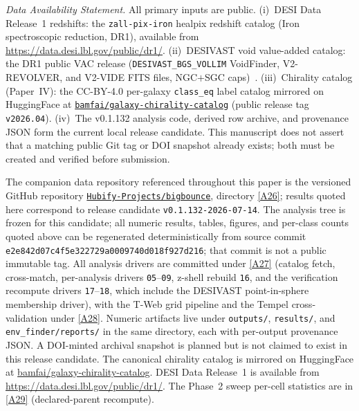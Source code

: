 \documentclass[aps,prd,twocolumn,superscriptaddress,showpacs,preprintnumbers,nofootinbib,longbibliography,floatfix]{revtex4-2}
\newcommand{\repoBase}{https://github.com/Hubify-Projects/bigbounce/blob/main}
\newcommand{\paperVersion}{v0.1.132-2026-07-14}
\begin{document}
\emph{Data Availability Statement.} All primary inputs are public.
(i)~DESI Data Release~1 redshifts: the \texttt{zall-pix-iron} healpix
redshift catalog (Iron spectroscopic reduction, DR1), available from
\url{https://data.desi.lbl.gov/public/dr1/}.
(ii)~DESIVAST void value-added catalog: the DR1 public VAC release
(\texttt{DESIVAST\_BGS\_VOLLIM} VoidFinder, V2-REVOLVER, and V2-VIDE
FITS files, NGC$+$SGC caps)~\cite{DESIVAST2025}.
(iii)~Chirality catalog (Paper~IV): the CC-BY-4.0 per-galaxy
\texttt{class\_eq} label catalog mirrored on HuggingFace at
\href{https://huggingface.co/datasets/bamfai/galaxy-chirality-catalog}%
{\texttt{bamfai/galaxy-chirality-catalog}} (public release tag
\texttt{v2026.04}).
(iv)~The v0.1.132 analysis code, derived row archive, and provenance JSON
form the current local release candidate. This manuscript does not assert that a
matching public Git tag or DOI snapshot already exists; both must be
created and verified before submission.

The companion data repository referenced throughout this paper is the
versioned GitHub repository
\href{https://github.com/Hubify-Projects/bigbounce}%
{\texttt{Hubify-Projects/bigbounce}}, directory
\href{\repoBase/pipelines/p5\_desi\_chirality/}{[A26]}; results quoted here
correspond to release candidate \texttt{\paperVersion}. The analysis
tree is frozen for this candidate; all numeric results, tables,
figures, and per-class counts quoted above can be regenerated
deterministically from source commit
\texttt{e2e842d07c4f5e322729a0009740d018f927d216}; that commit is not a
public immutable tag. All analysis
drivers are committed under
\href{\repoBase/pipelines/p5\_desi\_chirality/scripts/}{[A27]} (catalog fetch,
cross-match, per-analysis drivers \texttt{05}--\texttt{09}, z-shell
rebuild \texttt{16}, and the verification recompute drivers
\texttt{17}--\texttt{18}, which include the DESIVAST point-in-sphere
membership driver), with the T-Web grid pipeline and the Tempel
cross-validation under
\href{\repoBase/pipelines/p5\_desi\_chirality/env\_finder/}{[A28]}. Numeric
artifacts live under \texttt{outputs/}, \texttt{results/}, and
\texttt{env\_finder/reports/} in the same directory, each with
per-output provenance JSON. A DOI-minted archival snapshot is planned
but is not claimed to exist in this release candidate. The canonical chirality
catalog is mirrored on HuggingFace at
\href{https://huggingface.co/datasets/bamfai/galaxy-chirality-catalog}%
{bamfai/galaxy-chirality-catalog}. DESI Data Release~1 is available from
\url{https://data.desi.lbl.gov/public/dr1/}. The Phase~2 sweep
per-cell statistics are in
\href{\repoBase/pipelines/p5\_desi\_chirality/env\_finder/reports/02\_phase2\_sweep.csv}{[A29]}
(declared-parent recompute).
\end{document}
